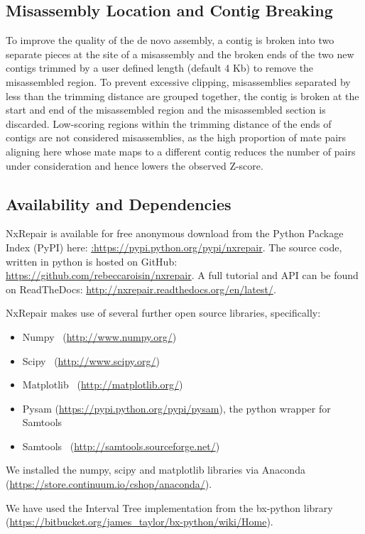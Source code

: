 \documentclass[fleqn,10pt]{wlpeerj}
\begin{document}
\subsection*{Misassembly Location and Contig Breaking}
To improve the quality of the de novo assembly, a contig is broken into two separate pieces at the site of a misassembly and the broken ends of the two new contigs trimmed by a user defined length (default 4 Kb) to remove the misassembled region. To prevent excessive clipping, misassemblies separated by less than the trimming distance are grouped together, the contig is broken at the start and end of the misassembled region and the misassembled section is discarded. Low-scoring regions within the trimming distance of the ends of contigs are not considered misassemblies, as the high proportion of mate pairs aligning here whose mate maps to a different contig reduces the number of pairs under consideration and hence lowers the observed Z-score.

\subsection*{Availability and Dependencies}
NxRepair is available for free anonymous download from the Python Package Index (PyPI) here: \url{:https://pypi.python.org/pypi/nxrepair}.
The source code, written in python is hosted on GitHub: \url{https://github.com/rebeccaroisin/nxrepair}.
A full tutorial and API can be found on ReadTheDocs: \url{http://nxrepair.readthedocs.org/en/latest/}.

NxRepair makes use of several further open source libraries, specifically:

\begin{itemize}
\item[] Numpy~\citep{numpy} (\url{http://www.numpy.org/})
\item[] Scipy~\citep{scipy} (\url{http://www.scipy.org/})
\item[] Matplotlib~\citep{Hunter2007} (\url{http://matplotlib.org/})
\item[] Pysam (\url{https://pypi.python.org/pypi/pysam}), the python wrapper for Samtools
\item[] Samtools~\citep{li2009} (\url{http://samtools.sourceforge.net/})
\end{itemize}

We installed the numpy, scipy and matplotlib libraries via Anaconda (\url{https://store.continuum.io/cshop/anaconda/}).

We have used the Interval Tree implementation from the bx-python library (\url{https://bitbucket.org/james_taylor/bx-python/wiki/Home}).   
\end{document}
